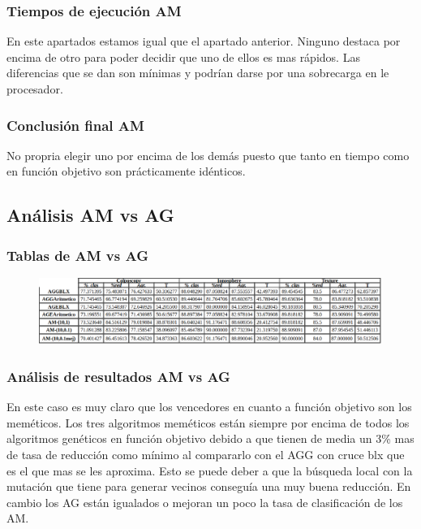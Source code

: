 \documentclass[titlepage]{article}
\begin{document}
	\subsubsection{Tiempos de ejecución AM}
	En este apartados estamos igual que el apartado anterior. Ninguno destaca por encima de otro para poder decidir que uno de ellos es mas rápidos. Las diferencias que se dan son mínimas y podrían darse por una sobrecarga en le procesador.
	
	\subsubsection{Conclusión final AM}
	No propria elegir uno por encima de los demás puesto que tanto en tiempo como en función objetivo son prácticamente idénticos.
	
	\subsection{Análisis AM vs AG}
	\subsubsection{Tablas de AM vs AG}
	\begin{figure}[H]
		\centering
		\includegraphics[width=1\linewidth]{screenshot010}
		\caption{}
		\label{fig:screenshot010}
	\end{figure}

	\subsubsection{Análisis de resultados AM vs AG}
	En este caso es muy claro que los vencedores en cuanto a función objetivo son los meméticos. Los tres algoritmos meméticos están siempre por encima de todos los algoritmos genéticos en función objetivo debido a que tienen de media un 3\% mas de tasa de reducción como mínimo al compararlo con el AGG con cruce blx que es el que mas se les aproxima. Esto se puede deber a que la búsqueda local con la mutación que tiene para generar vecinos conseguía una muy buena reducción. En cambio los AG están igualados o mejoran un poco la tasa de clasificación  de los AM. 
	
\end{document}
